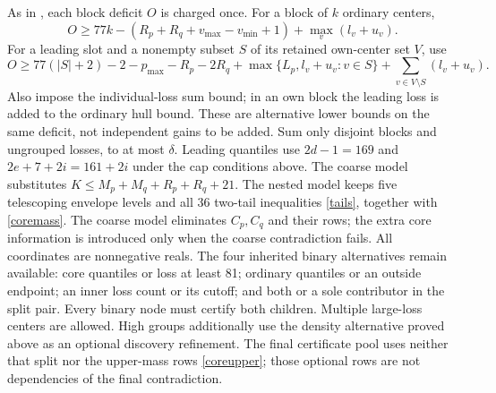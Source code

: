 \documentclass[11pt,a4paper]{article}
\begin{document}
As in \cite{overlap}, each block deficit $O$ is charged once. For a
block of $k$ ordinary centers,
\[
 O\ge77k-(R_p+R_q+v_{\max}-v_{\min}+1)+\max_v(l_v+u_v).
\]
For a leading slot and a nonempty subset $S$ of its retained own-center
set $V$, use
\[
 O\ge77(|S|+2)-2-p_{\max}-R_p-2R_q
 +\max\{L_p,l_v+u_v:v\in S\}
 +\sum_{v\in V\setminus S}(l_v+u_v).
\]
Also impose the individual-loss sum bound; in an own block the leading
loss is added to the ordinary hull bound. These are alternative lower
bounds on the same deficit, not independent gains to be added. Sum only
disjoint blocks and ungrouped losses, to at most $\delta$.
Leading quantiles use $2d-1=169$ and $2e+7+2i=161+2i$ under the cap
conditions above. The coarse model substitutes
$K\le M_p+M_q+R_p+R_q+21$. The nested model keeps five telescoping envelope levels and all
36 two-tail inequalities \eqref{tails}, together with \eqref{coremass}.
The coarse model eliminates $C_p,C_q$ and their rows; the extra core
information is introduced only when the coarse contradiction fails.
All coordinates are nonnegative reals. The four inherited binary
alternatives remain available: core quantiles or loss at least 81;
ordinary quantiles or an outside endpoint; an inner loss count or its
cutoff; and both or a sole contributor in the split pair. Every binary
node must certify both children. Multiple large-loss centers are allowed. High groups additionally use
the density alternative proved above as an optional discovery refinement.
The final certificate pool uses neither that split nor the upper-mass
rows \eqref{coreupper}; those optional rows are not dependencies of the
final contradiction.
\end{document}
